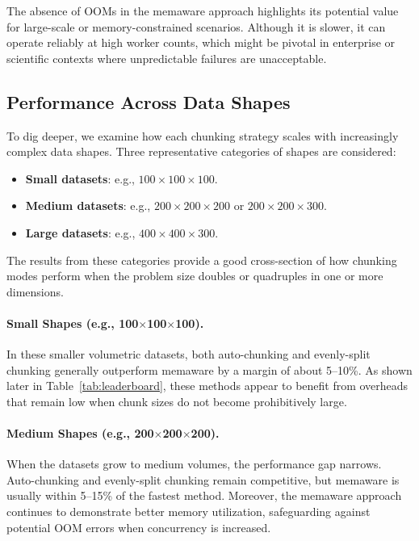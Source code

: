 The absence of \ac{OOM}s in the memaware approach highlights its potential value for large-scale or memory-constrained scenarios.
Although it is slower, it can operate reliably at high worker counts, which might be pivotal in enterprise or scientific contexts where unpredictable failures are unacceptable.

\subsection{Performance Across Data Shapes}
\label{subsec:per-shape-performance}

To dig deeper, we examine how each chunking strategy scales with increasingly complex data shapes.
Three representative categories of shapes are considered:
\begin{itemize}
    \item \textbf{Small datasets}: e.g., \(100 \times 100 \times 100\).
    \item \textbf{Medium datasets}: e.g., \(200 \times 200 \times 200\) or \(200 \times 200 \times 300\).
    \item \textbf{Large datasets}: e.g., \(400 \times 400 \times 300\).
\end{itemize}
The results from these categories provide a good cross-section of how chunking modes perform when the problem size doubles or quadruples in one or more dimensions.

\paragraph{Small Shapes (e.g., 100\(\times\)100\(\times\)100).}
In these smaller volumetric datasets, both auto-chunking and evenly-split chunking generally outperform memaware by a margin of about 5--10\%.
As shown later in Table~\ref{tab:leaderboard}, these methods appear to benefit from overheads that remain low when chunk sizes do not become prohibitively large.

\paragraph{Medium Shapes (e.g., 200\(\times\)200\(\times\)200).}
When the datasets grow to medium volumes, the performance gap narrows.
Auto-chunking and evenly-split chunking remain competitive, but memaware is usually within 5--15\% of the fastest method.
Moreover, the memaware approach continues to demonstrate better memory utilization, safeguarding against potential \ac{OOM} errors when concurrency is increased.

